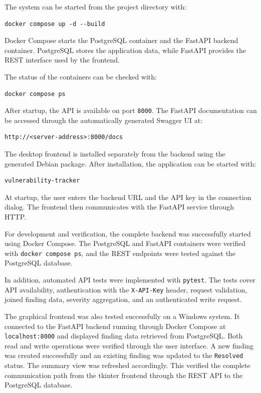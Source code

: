 \documentclass[11pt,a4paper]{article}
\begin{document}
The system can be started from the project directory with:

\begin{verbatim}
docker compose up -d --build
\end{verbatim}

Docker Compose starts the PostgreSQL container and the FastAPI backend
container. PostgreSQL stores the application data, while FastAPI provides the
REST interface used by the frontend.

The status of the containers can be checked with:

\begin{verbatim}
docker compose ps
\end{verbatim}

After startup, the API is available on port \texttt{8000}. The FastAPI
documentation can be accessed through the automatically generated Swagger UI
at:

\begin{verbatim}
http://<server-address>:8000/docs
\end{verbatim}

The desktop frontend is installed separately from the backend using the
generated Debian package. After installation, the application can be started
with:

\begin{verbatim}
vulnerability-tracker
\end{verbatim}

At startup, the user enters the backend URL and the API key in the connection
dialog. The frontend then communicates with the FastAPI service through HTTP.

For development and verification, the complete backend was successfully
started using Docker Compose. The PostgreSQL and FastAPI containers were
verified with \texttt{docker compose ps}, and the REST endpoints were tested
against the PostgreSQL database.

In addition, automated API tests were implemented with \texttt{pytest}. The
tests cover API availability, authentication with the \texttt{X-API-Key}
header, request validation, joined finding data, severity aggregation, and an
authenticated write request.

The graphical frontend was also tested successfully on a Windows system. It
connected to the FastAPI backend running through Docker Compose at
\texttt{localhost:8000} and displayed finding data retrieved from PostgreSQL.
Both read and write operations were verified through the user interface. A new
finding was created successfully and an existing finding was updated to the
\texttt{Resolved} status. The summary view was refreshed accordingly. This
verified the complete communication path from the tkinter frontend through the
REST API to the PostgreSQL database.
\end{document}
